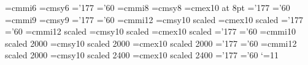 %
%
\font\sixi=cmmi6
\font\sixsy=cmsy6
\skewchar\sixi='177
\skewchar\sixsy='60
\font\eighti=cmmi8
\font\eightsy=cmsy8
\font\eightex=cmex10 at 8pt
\skewchar\eighti='177
\skewchar\eightsy='60
\font\ninei=cmmi9
\font\ninesy=cmsy9
\skewchar\ninei='177
\skewchar\ninesy='60
\font\twelvei=cmmi12
\font\twelvesy=cmsy10 scaled
\font\twelveex=cmex10 scaled
\skewchar\twelvei='177
\skewchar\twelvesy='60
\font\fourteeni=cmmi12 scaled
\font\fourteensy=cmsy10 scaled
\font\fourteenex=cmex10 scaled
\skewchar\fourteeni='177
\skewchar\fourteensy='60
\font\twentyi=cmmi10 scaled 2000
\font\twentysy=cmsy10 scaled 2000
\font\twentyex=cmex10 scaled 2000
\skewchar\twentyi='177
\skewchar\twentysy='60
\font\twentyfouri=cmmi12 scaled 2000
\font\twentyfoursy=cmsy10 scaled 2400
\font\twentyfourex=cmex10 scaled 2400
\skewchar\twentyfouri='177
\skewchar\twentyfoursy='60
\newdimen\bigsize
\newdimen\Bigsize
\newdimen\biggsize
\newdimen\Biggsize
\bigsize=8.5pt
\Bigsize=11.5pt
\biggsize=14.5pt
\Biggsize=17.5pt
\catcode`\@=11
